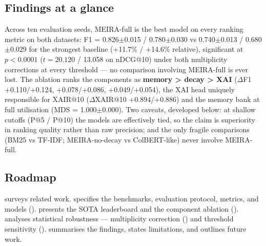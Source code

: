 \subsection{Findings at a glance}
\label{sec:intro-findings}

Across ten evaluation seeds, MEIRA-full is the best model on every ranking metric on both datasets: F1 = 0.826$\pm$0.015 / 0.780$\pm$0.030 vs 0.740$\pm$0.013 / 0.680$\pm$0.029 for the strongest baseline (+11.7\% / +14.6\% relative), significant at $p < 0.0001$ ($t = 20.120$ / 13.058 on nDCG@10) under both multiplicity corrections at every threshold --- no comparison involving MEIRA-full is ever lost. The ablation ranks the components as \textbf{memory > decay > XAI} ($\Delta$F1 +0.110/+0.124, +0.078/+0.086, +0.049/+0.054), the XAI head uniquely responsible for XAIR@10 ($\Delta$XAIR@10 +0.894/+0.886) and the memory bank at full utilisation (MDS = 1.000$\pm$0.000). Two caveats, developed below: at shallow cutoffs (P@5 / P@10) the models are effectively tied, so the claim is superiority in ranking quality rather than raw precision; and the only fragile comparisons (BM25 vs TF-IDF; MEIRA-no-decay vs ColBERT-like) never involve MEIRA-full.

\subsection{Roadmap}
\label{sec:intro-roadmap}

 surveys related work.  specifies the benchmarks, evaluation protocol, metrics, and models ().  presents the SOTA leaderboard and the component ablation ().  analyses statistical robustness --- multiplicity correction () and threshold sensitivity ().  summarises the findings, states limitations, and outlines future work.


%
%
